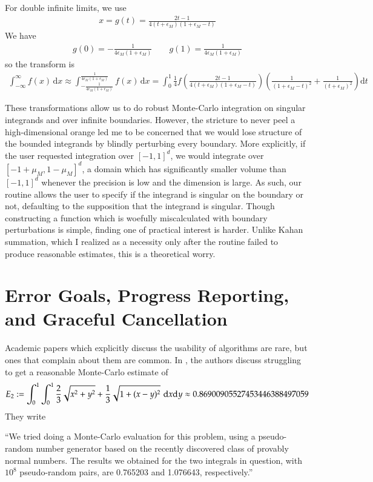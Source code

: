 \documentclass{ansarticle}
\begin{document}
For double infinite limits, we use
\begin{align*}
x = g(t) = \frac{2t-1}{4(t+\epsilon_{M})(1+\epsilon_{M}-t)}
\end{align*}
We have
\begin{align*}
g(0) = -\frac{1}{4\epsilon_{M}(1+\epsilon_{M})} \qquad g(1) = \frac{1}{4\epsilon_{M}(1+\epsilon_{M})}
\end{align*}
so the transform is
\begin{align*}
\int_{-\infty}^{\infty} f(x) \, \mathrm{d}x \approx \int_{-\frac{1}{4\epsilon_{M}(1+\epsilon_{M})}}^{ \frac{1}{4\epsilon_{M}(1+\epsilon_{M})}}
f(x) \, \mathrm{d}x
=
 \int_{0}^{1}\frac{1}{4} f\left( \frac{2t-1}{4(t+\epsilon_{M})(1+\epsilon_{M}-t)} \right) \left(\frac{1}{(1+\epsilon_{M}-t)^2} + \frac{1}{(t+\epsilon_{M})^2} \right) \mathrm{d}t
\end{align*}

These transformations allow us to do robust Monte-Carlo integration on singular integrands and over infinite boundaries.
However, the stricture to never peel a high-dimensional orange led me to be concerned that we would lose structure of the bounded integrands by blindly perturbing every boundary.
More explicitly, if the user requested integration over $[-1, 1]^{d}$, we would integrate over $[-1+\mu_{M}, 1-\mu_{M}]^{d}$, a domain which has significantly smaller volume than $[-1, 1]^{d}$ whenever the precision is low and the dimension is large.
As such, our routine allows the user to specify if the integrand is singular on the boundary or not, defaulting to the supposition that the integrand is singular.
Though constructing a function which is woefully miscalculated with boundary perturbations is simple, finding one of practical interest is harder.
Unlike Kahan summation, which I realized as a necessity only after the routine failed to produce reasonable estimates, this is a theoretical worry.


\section{Error Goals, Progress Reporting, and Graceful Cancellation}

Academic papers which explicitly discuss the usability of algorithms are rare, but ones that complain about them are common.
In \citep{bailey2006ten}, the authors discuss struggling to get a reasonable Monte-Carlo estimate of
\begin{align*}
E_{2} :=\int_{0}^{1}\int_{0}^{1}  \frac{2}{3}\sqrt{x^2+y^2} + \frac{1}{3}\sqrt{1+ (x-y)^2} \, \,\mathrm{d}x \mathrm{d}y \approx 0.86900905527453446388497059
\end{align*}
They write
\begin{displayquote}
``We tried doing a Monte-Carlo evaluation for this problem, using a pseudo-random number generator based on the recently discovered class of provably normal numbers. The results we obtained for the two integrals in question, with $10^8$ pseudo-random pairs, are 0.765203 and 1.076643, respectively.''
\end{displayquote}
\end{document}
